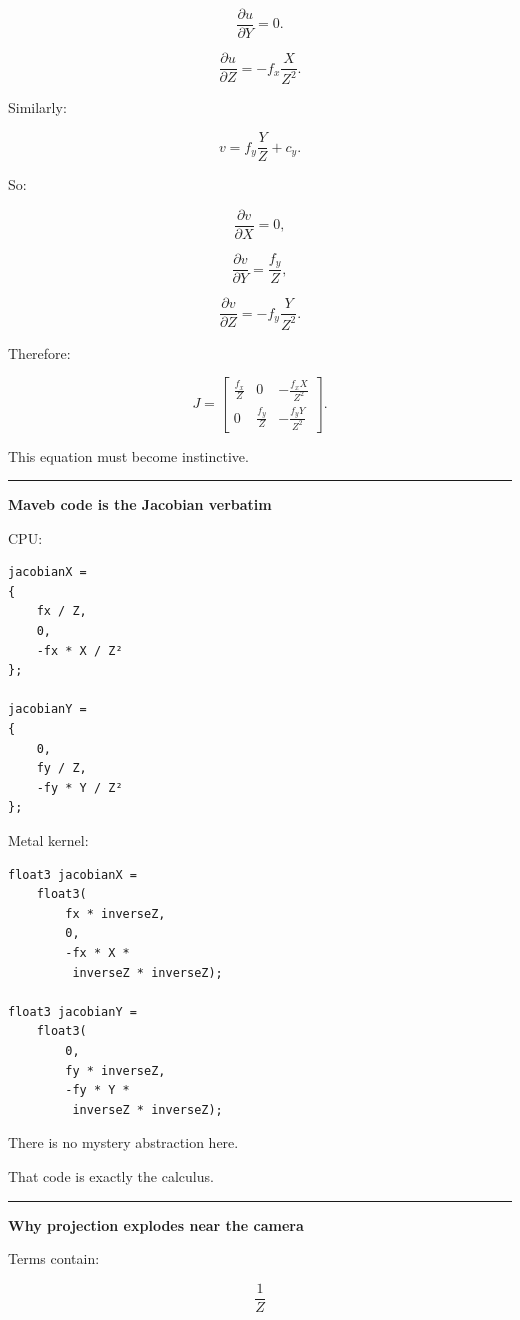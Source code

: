 \[
\frac{\partial u}{\partial Y}
=
0.
\]

\[
\frac{\partial u}{\partial Z}
=
-f_x\frac{X}{Z^2}.
\]

Similarly:

\[
v=
f_y\frac YZ+c_y.
\]

So:

\[
\frac{\partial v}{\partial X}=0,
\]

\[
\frac{\partial v}{\partial Y}
=
\frac{f_y}{Z},
\]

\[
\frac{\partial v}{\partial Z}
=
-f_y\frac{Y}{Z^2}.
\]

Therefore:

\[
\boxed{
J=
\begin{bmatrix}
\frac{f_x}{Z}
&
0
&
-\frac{f_xX}{Z^2}
\\
0
&
\frac{f_y}{Z}
&
-\frac{f_yY}{Z^2}
\end{bmatrix}.
}
\]

This equation must become instinctive.

\begin{center}\rule{0.5\linewidth}{0.5pt}\end{center}

\textbf{Maveb code is the Jacobian verbatim}

CPU:

\begin{verbatim}
jacobianX =
{
    fx / Z,
    0,
    -fx * X / Z²
};

jacobianY =
{
    0,
    fy / Z,
    -fy * Y / Z²
};
\end{verbatim}

Metal kernel:

\begin{verbatim}
float3 jacobianX =
    float3(
        fx * inverseZ,
        0,
        -fx * X *
         inverseZ * inverseZ);

float3 jacobianY =
    float3(
        0,
        fy * inverseZ,
        -fy * Y *
         inverseZ * inverseZ);
\end{verbatim}

There is no mystery abstraction here.

That code is exactly the calculus.

\begin{center}\rule{0.5\linewidth}{0.5pt}\end{center}

\textbf{Why projection explodes near the camera}

Terms contain:

\[
\frac1Z
\]

